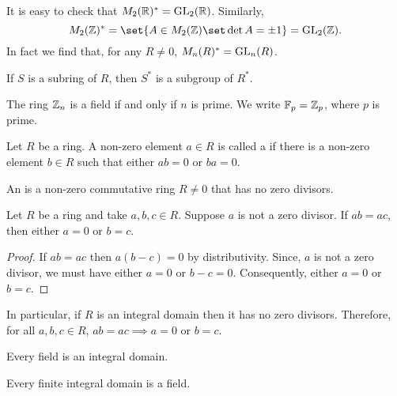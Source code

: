 \documentclass[11pt]{penrose}
\begin{document}
\begin{negg}
    It is easy to check that $M_2 (\mathbb{R})^* = \mathrm{GL}_2 (\mathbb{R})$. Similarly,
    \begin{equation*}
        M_2 (\Z)^*
        = \set{A \in M_2 (\Z) \set \det A = \pm 1}
        = \GL_2 (\Z).
    \end{equation*}
    In fact we find that, for any $R \neq 0$, $M_n (R)^* = \mathrm{GL}_n (R)$.
\end{negg}

\begin{nthm}
    If $S$ is a subring of $R$, then $S^*$ is a subgroup of $R^*$.
\end{nthm}

\begin{nthm}
    The ring $\mathbb{Z}_n$ is a field if and only if $n$ is prime. We write $\mathbb{F}_p = \mathbb{Z}_p$, where $p$ is prime.
\end{nthm}

\begin{ndfn}
    Let $R$ be a ring. A non-zero element $a \in R$ is called a  if there is a non-zero element $b \in R$ such that either $ab = 0$ or $ba = 0$.
\end{ndfn}

\begin{ndfn}
    An  is a non-zero commutative ring $R \neq 0$ that has no zero divisors.
\end{ndfn}

\begin{nthm}
    Let $R$ be a ring and take $a, b, c \in R$. Suppose $a$ is not a zero divisor. If $ab = ac$, then either $a = 0$ or $b = c$.
\end{nthm}
\begin{proof}
    If $ab = ac$ then $a (b - c) = 0$ by distributivity. Since, $a$ is not a zero divisor, we must have either $a = 0$ or $b-c = 0$. Consequently, either $a = 0$ or $b = c$.
\end{proof}
\begin{remark}
    In particular, if $R$ is an integral domain then it has no zero divisors. Therefore, for all $a, b, c \in R$, $ab = ac \implies a = 0$ or $b = c$.
\end{remark}

\begin{nthm}
    Every field is an integral domain.
\end{nthm}

\begin{nthm}
    Every finite integral domain is a field.
\end{nthm}
\end{document}
